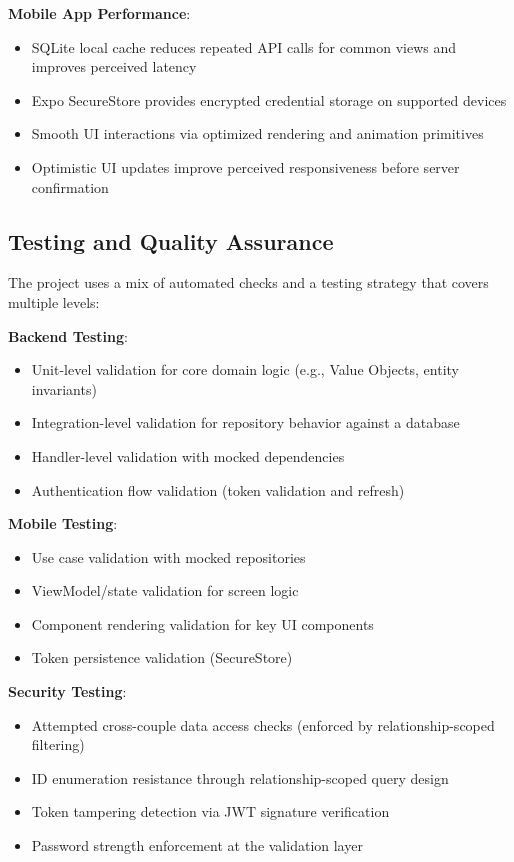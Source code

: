 \documentclass[sigconf, authorversion, nonacm, margin=0.75in]{acmart}
\begin{document}
\textbf{Mobile App Performance}:
\begin{itemize}
  \item SQLite local cache reduces repeated API calls for common views and improves perceived latency
  \item Expo SecureStore provides encrypted credential storage on supported devices
  \item Smooth UI interactions via optimized rendering and animation primitives
  \item Optimistic UI updates improve perceived responsiveness before server confirmation
\end{itemize}

\subsection{Testing and Quality Assurance}
The project uses a mix of automated checks and a testing strategy that covers multiple levels:

\textbf{Backend Testing}:
\begin{itemize}
  \item Unit-level validation for core domain logic (e.g., Value Objects, entity invariants)
  \item Integration-level validation for repository behavior against a database
  \item Handler-level validation with mocked dependencies
  \item Authentication flow validation (token validation and refresh)
\end{itemize}

\textbf{Mobile Testing}:
\begin{itemize}
  \item Use case validation with mocked repositories
  \item ViewModel/state validation for screen logic
  \item Component rendering validation for key UI components
  \item Token persistence validation (SecureStore)
\end{itemize}

\textbf{Security Testing}:
\begin{itemize}
  \item Attempted cross-couple data access checks (enforced by relationship-scoped filtering)
  \item ID enumeration resistance through relationship-scoped query design
  \item Token tampering detection via JWT signature verification
  \item Password strength enforcement at the validation layer
\end{itemize}
\end{document}
